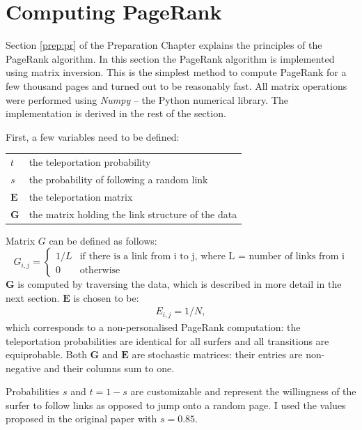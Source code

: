 \documentclass[12pt,notitlepage,twoside]{scrbook}
\begin{document}
\section{Computing PageRank} 
\label{impl:pr}

Section \ref{prep:pr} of the Preparation Chapter explains the principles of the PageRank
algorithm. In this section the PageRank algorithm is implemented using matrix inversion.
This is the simplest method to compute PageRank for a few thousand pages and turned
out to be reasonably fast. All matrix operations were performed using \textit{Numpy} --
the Python numerical library. The implementation is derived in the rest of the section.

First, a few variables need to be defined:

\begin{tabular}[h!]{l l}
	\(t\) & the teleportation probability \\
	\(s\) & the probability of following a random link \\
	\(\bm{E}\) & the teleportation matrix \\
	\(\bm{G}\) & the matrix holding the link structure of the data \\
\end{tabular}

Matrix \(G\) can be defined as follows:
\begin{equation*}
	G_{i,j} = \begin{cases}
    1/L & \text{if there is a link from i to j, where L = number of links from i}\\
    0   & \text{otherwise}
  \end{cases}
\end{equation*}
\(\bm{G}\) is computed by traversing the data, which is described in more detail in the next
section. \(\bm{E}\) is chosen to be:
\begin{gather*}
	E_{i,j} = 1/N, 
\end{gather*}
which corresponds to a non-personalised PageRank computation: the teleportation
probabilities are identical for all surfers and all transitions are equiprobable.
Both \(\bm{G}\) and \(\bm{E}\) are stochastic matrices: their entries are non-negative and their columns sum
to one.

Probabilities \(s\) and \(t=1-s\) are customizable and represent the willingness of the surfer to
follow links as opposed to jump onto a random page. I used the values proposed in the
original paper\cite{pagerank} with \(s=0.85\).
\end{document}
